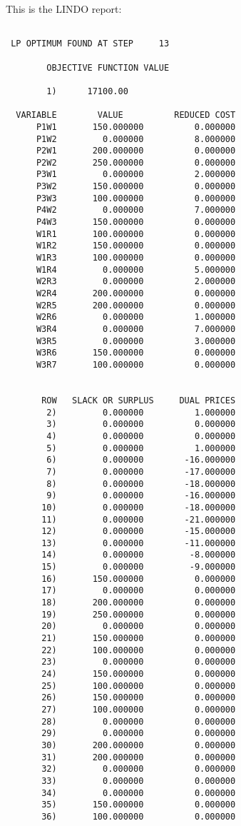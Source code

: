 This is the LINDO report:
\begin{verbatim}

 LP OPTIMUM FOUND AT STEP     13

        OBJECTIVE FUNCTION VALUE

        1)      17100.00

  VARIABLE        VALUE          REDUCED COST
      P1W1       150.000000          0.000000
      P1W2         0.000000          8.000000
      P2W1       200.000000          0.000000
      P2W2       250.000000          0.000000
      P3W1         0.000000          2.000000
      P3W2       150.000000          0.000000
      P3W3       100.000000          0.000000
      P4W2         0.000000          7.000000
      P4W3       150.000000          0.000000
      W1R1       100.000000          0.000000
      W1R2       150.000000          0.000000
      W1R3       100.000000          0.000000
      W1R4         0.000000          5.000000
      W2R3         0.000000          2.000000
      W2R4       200.000000          0.000000
      W2R5       200.000000          0.000000
      W2R6         0.000000          1.000000
      W3R4         0.000000          7.000000
      W3R5         0.000000          3.000000
      W3R6       150.000000          0.000000
      W3R7       100.000000          0.000000


       ROW   SLACK OR SURPLUS     DUAL PRICES
        2)         0.000000          1.000000
        3)         0.000000          0.000000
        4)         0.000000          0.000000
        5)         0.000000          1.000000
        6)         0.000000        -16.000000
        7)         0.000000        -17.000000
        8)         0.000000        -18.000000
        9)         0.000000        -16.000000
       10)         0.000000        -18.000000
       11)         0.000000        -21.000000
       12)         0.000000        -15.000000
       13)         0.000000        -11.000000
       14)         0.000000         -8.000000
       15)         0.000000         -9.000000
       16)       150.000000          0.000000
       17)         0.000000          0.000000
       18)       200.000000          0.000000
       19)       250.000000          0.000000
       20)         0.000000          0.000000
       21)       150.000000          0.000000
       22)       100.000000          0.000000
       23)         0.000000          0.000000
       24)       150.000000          0.000000
       25)       100.000000          0.000000
       26)       150.000000          0.000000
       27)       100.000000          0.000000
       28)         0.000000          0.000000
       29)         0.000000          0.000000
       30)       200.000000          0.000000
       31)       200.000000          0.000000
       32)         0.000000          0.000000
       33)         0.000000          0.000000
       34)         0.000000          0.000000
       35)       150.000000          0.000000
       36)       100.000000          0.000000


\end{verbatim}
